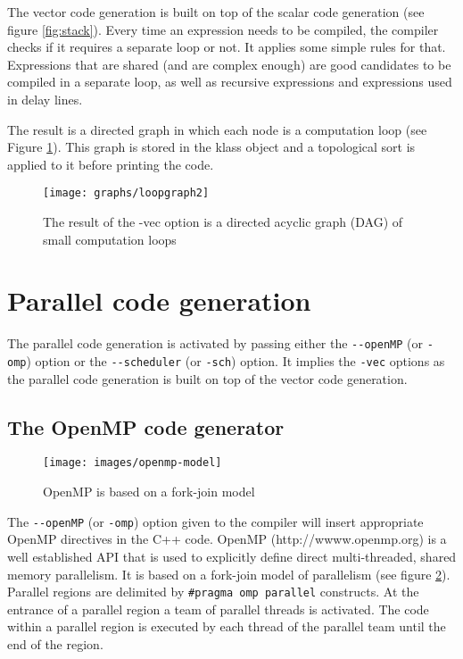 The vector code generation is built on top of the scalar code generation (see figure \ref{fig:stack}). Every time an expression needs to be compiled, the compiler checks if it requires a separate loop or not. It applies some simple rules for that. Expressions that are shared (and are complex enough) are good candidates to be compiled in a separate loop, as well as recursive expressions and expressions used in delay lines. 

The result is a directed graph in which each node is a computation loop (see Figure \ref{fig:loopgraph}). This graph is stored in the klass object and a topological sort is applied to it before printing the code. 

\begin{figure}[htb]
  \centering
  \texttt{[image: graphs/loopgraph2]}
  \caption{The result of the -vec option is a directed acyclic graph (DAG) of small computation loops}   
  \label{fig:loopgraph}
\end{figure}

\section{Parallel code generation}

The parallel code generation is activated by passing either the \lstinline!--openMP! (or \lstinline!-omp!) option or the \lstinline!--scheduler! (or \lstinline!-sch!) option. It implies the \lstinline!-vec! options as the parallel code generation is built on top of the vector code generation.  

\subsection{The OpenMP code generator}

\begin{figure}[htb]
  \centering
  \texttt{[image: images/openmp-model]}
  \caption{OpenMP is based on a fork-join model}   
  \label{fig:openmp}
\end{figure}

The \lstinline!--openMP! (or \lstinline!-omp!) option given to the \faust compiler will insert appropriate OpenMP directives in the C++ code. OpenMP (http://wwww.openmp.org) is a well established API that is used to explicitly define direct multi-threaded, shared memory parallelism. It is based on a fork-join model of parallelism (see figure \ref{fig:openmp}). 
Parallel regions are delimited by \lstinline!#pragma omp parallel! constructs. At the entrance of a parallel region a team of parallel threads is activated. The code within a parallel region is executed by each thread of the parallel team until the end of the region. 

